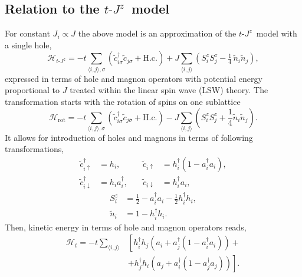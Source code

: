 \documentclass[%
 reprint,
 amsmath,amssymb,
 aps,
prb,
floatfix,
]{revtex4-1}
\newcommand{\mean}[1]{\langle#1\rangle}
\begin{document}
\subsection{Relation to the $t\text{-}J^z$~model}
 
For constant $J_i \propto J$ the above model is an approximation of the $t\text{-}J^z$~model with a single hole,
\begin{equation}
\mathcal{H}_{t\text{-}J^z} = -t \sum_{\mean{i,j},\sigma} \left(
\tilde{c}_{i\sigma}^{\dag}\tilde{c}_{j\sigma}^{}\!+\!\mathrm{H.c.}\!\right)
+ J \sum_{\mean{i,j}}\left( S_{i}^{z}S_{j}^{z}\!
-\tfrac14\,\tilde{n}_i\tilde{n}_j\right),
\end{equation}
expressed in terms of hole and magnon operators with potential energy proportional to $J$ treated within the linear spin wave (LSW) theory. The transformation starts with the rotation of spins on one sublattice
\begin{equation}
\mathcal{H}_{\text{rot}} = -t \sum_{\mean{i,j},\sigma} \left( \tilde{c}_{i\sigma}^\dag \tilde{c}_{j\bar{\sigma}} + \text{H.c.} \right) - J \sum_{\mean{i,j}} ( S_i^z S_j^z + \frac{1}{4} \tilde{n}_i \tilde{n}_j ).
\end{equation}
It allows for introduction of holes and magnons in terms of following transformations,
\begin{equation}
\begin{aligned}
\tilde{c}_{i\uparrow}^\dag &= h_i, &\quad \tilde{c}_{i\uparrow} &= h_i^\dag (1 - a_i^\dag a_i), \\
\tilde{c}_{i\downarrow}^\dag &= h_i a_i^\dag, &\quad \tilde{c}_{i\downarrow} &= h_i^\dag a_i,
\end{aligned}
\end{equation}
\begin{equation}
\begin{aligned}
S_i^z &= \frac{1}{2} - a_i^\dag a_i - \frac{1}{2}h_i^\dag h_i, \\
\tilde{n}_i &= 1 - h_i^\dag h_i.
\end{aligned}
\end{equation}
Then, kinetic energy in terms of hole and magnon operators reads,
\begin{equation}
\begin{aligned}
\mathcal{H}_t = -t \sum_{\mean{i,j}} &\left[ h_i^\dag h_j \left( a_i + a_j^\dag (1 -  a_i^\dag a_i) \right)\right. + \\
&+ \left. h_j^\dag h_i \left( a_j + a_i^\dag (1 -  a_j^\dag a_j) \right)\right].
\end{aligned}
\end{equation}
\end{document}
